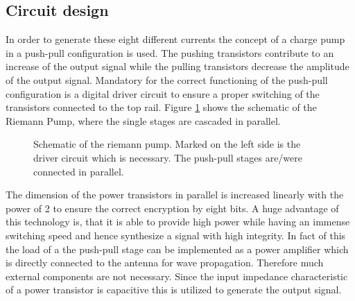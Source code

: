 \documentclass[journal]{IEEEtran}
\begin{document}
%
\subsection{Circuit design}
In order to generate these eight different currents the concept of a charge pump in a push-pull configuration is used.
The pushing transistors contribute to an increase of the output signal while the pulling transistors decrease the amplitude of the output signal.
Mandatory for the correct functioning of the push-pull configuration is a digital driver circuit to ensure a proper switching of the transistors connected to the top rail.
Figure \ref{fig:schematic_multibit_rp} shows the schematic of the Riemann Pump, where the single stages are cascaded in parallel.
%
\begin{figure}[htb]
  \centering
	\begin{scriptsize}
  	\def\svgwidth{\columnwidth}
 	 
  	\caption{Schematic of the riemann pump. Marked on the left side is the driver circuit which is necessary. The push-pull stages are/were connected in parallel.}
  	\label{fig:schematic_multibit_rp}
	\end{scriptsize}
\end{figure}
The dimension of the power transistors in parallel is increased linearly with the power of 2 to ensure the correct encryption by eight bits.
A huge advantage of this technology is, that it is able to provide high power while having an immense switching speed and hence synthesize a signal with high integrity.
In fact of this the load of a the push-pull stage can be implemented as a power amplifier which is directly connected to the antenna for wave propagation.
Therefore much external components are not necessary.
Since the input impedance characteristic of a power transistor is capacitive this is utilized to generate the output signal.
\end{document}
